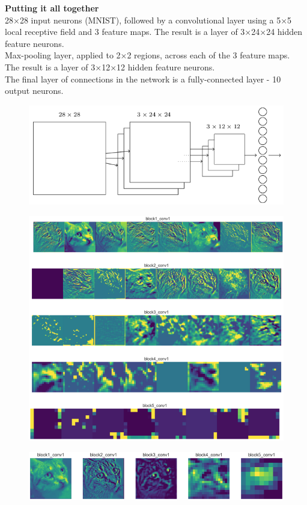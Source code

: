 \documentclass[10pt, compress]{beamer}
\begin{document}
\begin{frame}
  \vspace{0.6cm}
  \textbf{Putting it all together} \\
  28×28 input neurons (MNIST), followed by a convolutional layer using a 5×5 local receptive field and 3 feature maps. The result is a layer of 3×24×24 hidden feature neurons. \\
  Max-pooling layer, applied to 2×2 regions, across each of the 3 feature maps. \\
  The result is a layer of 3×12×12 hidden feature neurons. \\
  The final layer of connections in the network is a fully-connected layer - 10 output neurons.
  \begin{figure}
    \includegraphics[width=.7\linewidth]{imgs/cnn/cnn_5}
  \end{figure}
\end{frame}

\begin{frame}
  \begin{figure}
    \includegraphics[width=.7\linewidth]{imgs/cnn/vis_1}
  \end{figure}
  \begin{figure}
    \includegraphics[width=.7\linewidth]{imgs/cnn/vis_2}
  \end{figure}
\end{frame}
\end{document}
